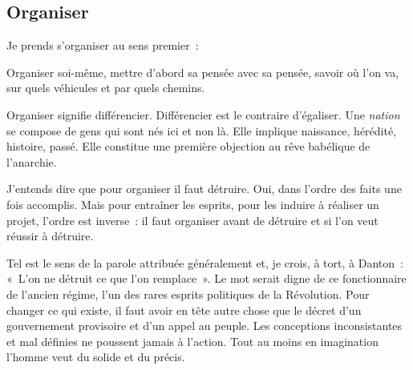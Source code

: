 \documentclass[french,twoside]{book} %
\begin{document}
\subsection[Organiser]{Organiser}
\noindent Je prends s’organiser au sens premier :\par
Organiser soi-même, mettre d’abord sa pensée avec sa pensée, savoir où l’on va, sur quels véhicules et par quels chemins.\par
Organiser signifie différencier. Différencier est le contraire d’égaliser. Une \emph{nation} se compose de gens qui sont nés ici et non là. Elle implique naissance, hérédité, histoire, passé. Elle constitue une première objection au rêve babélique de l’anarchie.\par
J’entends dire que pour organiser il faut détruire. Oui, dans l’ordre des faits une fois accomplis. Mais pour entraîner les esprits, pour les induire à réaliser un projet, l’ordre est inverse : il faut organiser avant de détruire et si l’on veut réussir à détruire.\par
Tel est le sens de la parole attribuée généralement et, je crois, à tort, à Danton : « L’on ne détruit ce que l’on remplace ». Le mot serait digne de ce fonctionnaire de l’ancien régime, l’un des rares esprits politiques de la Révolution. Pour changer ce qui existe, il faut avoir en tête autre chose que le décret d’un gouvernement provisoire et d’un appel au peuple. Les conceptions inconsistantes et mal définies ne poussent jamais à l’action. Tout au moins en imagination l’homme veut du solide et du précis.
\end{document}
